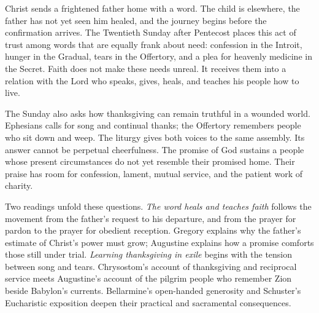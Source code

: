 Christ sends a frightened father home with a word. The child is elsewhere,
the father has not yet seen him healed, and the journey begins before the
confirmation arrives. The Twentieth Sunday after Pentecost places this act
of trust among words that are equally frank about need: confession in the
Introit, hunger in the Gradual, tears in the Offertory, and a plea for
heavenly medicine in the Secret. Faith does not make these needs unreal.
It receives them into a relation with the Lord who speaks, gives, heals,
and teaches his people how to live.

The Sunday also asks how thanksgiving can remain truthful in a wounded
world. Ephesians calls for song and continual thanks; the Offertory remembers
people who sit down and weep. The liturgy gives both voices to the same
assembly. Its answer cannot be perpetual cheerfulness. The promise of God
sustains a people whose present circumstances do not yet resemble their
promised home. Their praise has room for confession, lament, mutual service,
and the patient work of charity.

Two readings unfold these questions. \emph{The word heals and teaches faith}
follows the movement from the father's request to his departure, and from
the prayer for pardon to the prayer for obedient reception. Gregory explains
why the father's estimate of Christ's power must grow; Augustine explains
how a promise comforts those still under trial. \emph{Learning thanksgiving
in exile} begins with the tension between song and tears. Chrysostom's account
of thanksgiving and reciprocal service meets Augustine's account of the
pilgrim people who remember Zion beside Babylon's currents. Bellarmine's
open-handed generosity and Schuster's Eucharistic exposition deepen their
practical and sacramental consequences.

